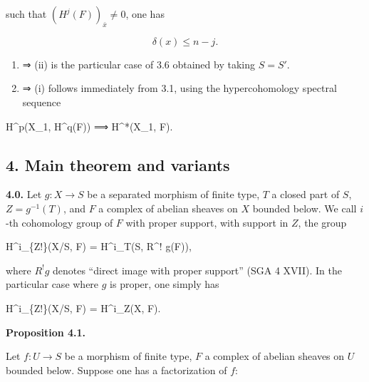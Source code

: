 \documentclass[
]{article}
\newenvironment{Shaded}{}{}
\newcommand{\NormalTok}[1]{#1}
\begin{document}
such that \((H^{j}(F))_{\bar{x}} \neq 0\), one has

\[
\delta(x) \leqslant n - j.
\]

\begin{enumerate}
\def\labelenumi{(\roman{enumi})}
\item
  ⇒ (ii) is the particular case of 3.6 obtained by taking \(S = S'\).
\item
  ⇒ (i) follows immediately from 3.1, using the hypercohomology spectral
  sequence
\end{enumerate}

\begin{Shaded}
\begin{Highlighting}[]
\NormalTok{H\^{}p(X\_1, H\^{}q(F)) ⟹ H\^{}*(X\_1, F).}
\end{Highlighting}
\end{Shaded}

\subsection{4. Main theorem and
variants}\label{main-theorem-and-variants}

\textbf{4.0.} Let \(g : X \to S\) be a separated morphism of finite
type, \(T\) a closed part of \(S\), \(Z = g^{-1}(T)\), and \(F\) a
complex of abelian sheaves on \(X\) bounded below. We call \(i\)-th
cohomology group of \(F\) with proper support, with support in \(Z\),
the group

\begin{Shaded}
\begin{Highlighting}[]
\NormalTok{H\^{}i\_\{Z!\}(X/S, F) = H\^{}i\_T(S, R\^{}! g(F)),}
\end{Highlighting}
\end{Shaded}

where \(R^{!} g\) denotes ``direct image with proper support'' (SGA 4
XVII). In the particular case where \(g\) is proper, one simply has

\begin{Shaded}
\begin{Highlighting}[]
\NormalTok{H\^{}i\_\{Z!\}(X/S, F) = H\^{}i\_Z(X, F).}
\end{Highlighting}
\end{Shaded}

\textbf{Proposition 4.1.}

Let \(f : U \to S\) be a morphism of finite type, \(F\) a complex of
abelian sheaves on \(U\) bounded below. Suppose one has a factorization
of \(f\):
\end{document}
